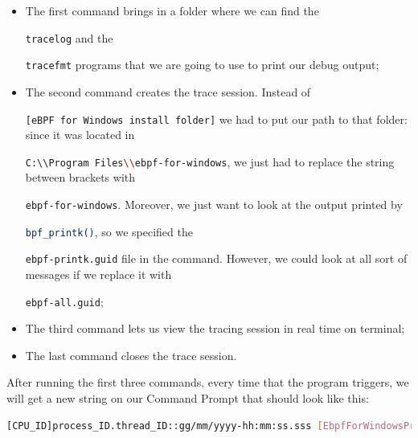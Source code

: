 \begin{itemize}
	\item 
		The first command brings in a folder where we can find the \raggedright\colorbox{backcolour}{\lstinline[style=commandline, language=bash]|tracelog|} and the \raggedright\colorbox{backcolour}{\lstinline[style=commandline, language=bash]|tracefmt|} programs that we are going to use to print our debug output;
	\item 
		The second command creates the trace session.
		Instead of \raggedright\colorbox{backcolour}{\lstinline[style=commandline, language=bash]|[eBPF for Windows install folder]|} we had to put our path to that folder: since it was located in \raggedright\colorbox{backcolour}{\lstinline[style=commandline, language=bash]|C:\\Program Files\\ebpf-for-windows|}, we just had to replace the string between brackets with \raggedright\colorbox{backcolour}{\lstinline[style=commandline, language=bash]|ebpf-for-windows|}.
		Moreover, we just want to look at the output printed by \raggedright\colorbox{backcolour}{\lstinline[style=commandline, language=bash]|bpf_printk()|}, so we specified the \raggedright\colorbox{backcolour}{\lstinline[style=commandline, language=bash]|ebpf-printk.guid|} file in the command.
		However, we could look at all sort of messages if we replace it with \raggedright\colorbox{backcolour}{\lstinline[style=commandline, language=bash]|ebpf-all.guid|};
	\item 
		The third command lets us view the tracing session in real time on terminal;
	\item 
		The last command closes the trace session.
\end{itemize}

After running the first three commands, every time that the program triggers, we will get a new string on our Command Prompt that should look like this:

\begin{lstlisting}[style=commandline, language=bash, caption={Real-time output messages format using \colorbox{backcolour}{\lstinline[style=commandline, language=bash]|tracelog|} and \colorbox{backcolour}{\lstinline[style=commandline, language=bash]|tracefmt|}.}]
	[CPU_ID]process_ID.thread_ID::gg/mm/yyyy-hh:mm:ss.sss [EbpfForWindowsProvider]{"Message":"Hello World x!"}
\end{lstlisting}

